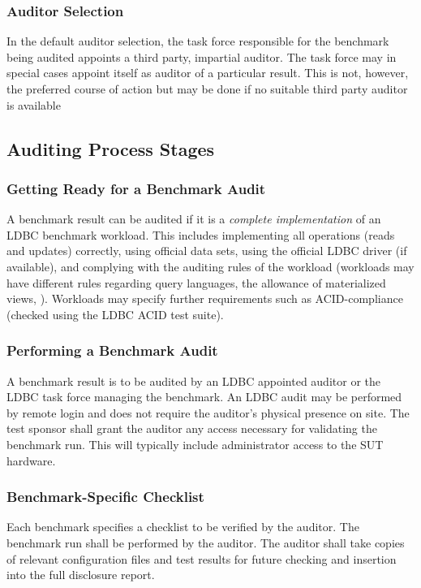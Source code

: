 \subsubsection{Auditor Selection}
In the default auditor selection, the task force responsible for the benchmark being audited appoints a third party, impartial auditor. The task force may in special cases appoint itself as auditor of a particular result. This is not, however, the preferred course of action but may be done if no suitable third party auditor is available


\subsection{Auditing Process Stages}
\subsubsection{Getting Ready for a Benchmark Audit}
A benchmark result can be audited if it is a \emph{complete implementation} of an LDBC benchmark workload. This includes implementing all operations (reads and updates) correctly, using official data sets, using the official LDBC driver (if available), and complying with the auditing rules of the workload (\eg workloads may have different rules regarding query languages, the allowance of materialized views, \etc).
Workloads may specify further requirements such as ACID-compliance (checked using the LDBC ACID test suite).

\subsubsection{Performing a Benchmark Audit}
A benchmark result is to be audited by an LDBC appointed auditor or the LDBC task force managing the benchmark. An LDBC audit may be performed by remote login and does not require the auditor's physical presence on site. The test sponsor shall grant the auditor any access necessary for validating the benchmark run. This will typically include administrator access to the SUT hardware.

\subsubsection{Benchmark-Specific Checklist}
Each benchmark specifies a checklist to be verified by the auditor. The benchmark run shall be performed by the auditor. The auditor shall take copies of relevant configuration files and test results for future checking and insertion into the full disclosure report.

